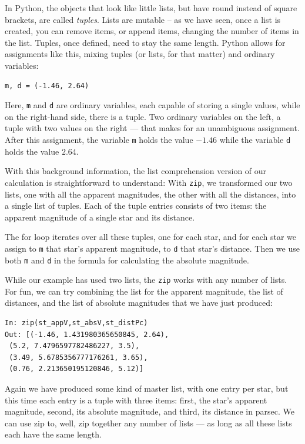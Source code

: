 \documentclass[twocolumn,apj]{openjournal}
\begin{document}
In Python, the objects that look like little lists, but have round instead of square brackets, are called {\em tuples}. Lists are mutable -- as we have seen, once a list is created, you can remove items, or append items, changing the number of items in the list. Tuples, once defined, need to stay the same length. Python allows for assignments like this, mixing tuples (or lists, for that matter) and ordinary variables:
\begin{lstlisting}
m, d = (-1.46, 2.64)
\end{lstlisting}
Here, \verb|m| and \verb|d| are ordinary variables, each capable of storing a single values, while on the right-hand side, there is a tuple. Two ordinary variables on the left, a tuple with two values on the right --- that makes for an unambiguous assignment. After this assignment, the variable \verb|m| holds the value $-1.46$ while the variable \verb|d| holds the value $2.64$. 

With this background information, the list comprehension version of our calculation is straightforward to understand: With \verb|zip|, we transformed our two lists, one with all the apparent magnitudes, the other with all the distances, into a single list of tuples. Each of the tuple entries consists of two items: the apparent magnitude of a single star and its distance. 

The for loop iterates over all these tuples, one for each star, and for each star we assign to \verb|m| that star's apparent magnitude, to \verb|d| that star's distance. Then we use both \verb|m| and \verb|d| in the formula for calculating the absolute magnitude.

While our example has used two lists, the \verb|zip| works with any number of lists. For fun, we can try combining the list for the apparent magnitude, the list of distances, and the list of absolute magnitudes that we have just produced:
\begin{lstlisting}
In: zip(st_appV,st_absV,st_distPc)
Out: [(-1.46, 1.431980365650845, 2.64),
 (5.2, 7.4796597782486227, 3.5),
 (3.49, 5.6785356777176261, 3.65),
 (0.76, 2.213650195120846, 5.12)]
\end{lstlisting}
Again we have produced some kind of master list, with one entry per star, but this time each entry is a tuple with three items: first, the star's apparent magnitude, second, its absolute magnitude, and third, its distance in parsec. We can use zip to, well, zip together any number of lists --- as long as all these lists each have the same length.
\end{document}
